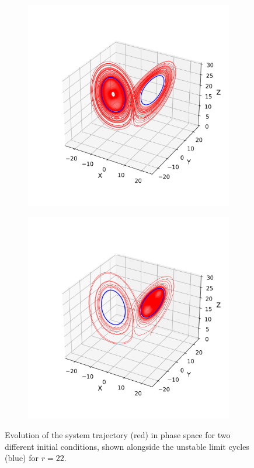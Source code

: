 \documentclass[paper=a4, fontsize=11pt]{scrartcl}
\numberwithin{equation}{section}		%
\numberwithin{figure}{section}			%
\numberwithin{table}{section}				%
\begin{document}
\begin{figure}[hbt!]
	\centering
	\begin{subfigure}[b]{0.495\textwidth}
		\centering
		\includegraphics[width=\textwidth]{media/attractor_with_orbit_r_22.08_seed_2.png}
		\caption{}
		\label{fig:sub1}
	\end{subfigure}
	\hfill
	\begin{subfigure}[b]{0.495\textwidth}
		\centering
		\includegraphics[width=\textwidth]{media/attractor_with_orbit_r_22.08_seed_100.png}
		\caption{}
		\label{fig:sub2}
	\end{subfigure}
	
	\caption{Evolution of the system trajectory (red) in phase space for two different initial conditions, shown alongside the unstable limit cycles (blue) for $r = 22$.}
	\label{fig:metastableattractor}
\end{figure}
\end{document}
